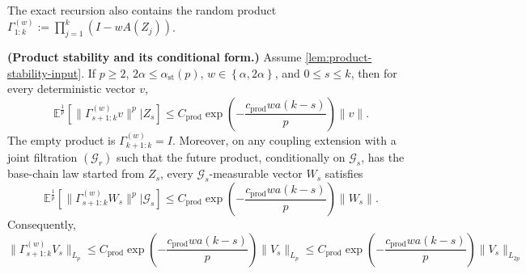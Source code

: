 The exact recursion also contains the random product
$\Gamma_{1:k}^{(w)} := \prod_{j = 1}^{k} (I - w A(Z_{j}))$.

\begin{lemma}\label{lem:burn-product-stability}
  \textbf{(Product stability and its conditional form.)}
  Assume \cref{lem:product-stability-input}. If $p \ge 2$,
  $2 \alpha \le \alpha_{\mathrm{st}}(p)$, $w \in \left\{ \alpha, 2 \alpha \right\}$, and $0 \le s \le k$,
  then for every deterministic vector $v$,
  \begin{equation}
\mathbb{E}^{\frac{1}{p}} \left[ \lVert \Gamma_{s + 1:k}^{(w)} v \rVert^{p} | Z_{s} \right]
    \le C_{\mathrm{prod}} \exp\left(- \frac{c_{\mathrm{prod}} w a (k - s)}{p}\right) \lVert v \rVert.
\label{eq:burn-product-stability-deterministic}
\end{equation}
  The empty product is $\Gamma_{k + 1:k}^{(w)} = I$. Moreover, on any coupling
  extension with a joint filtration $(\mathcal{G}_{r})$ such that the future product,
  conditionally on $\mathcal{G}_{s}$, has the base-chain law started from $Z_{s}$, every
  $\mathcal{G}_{s}$-measurable vector $W_{s}$ satisfies
  \begin{equation}
\mathbb{E}^{\frac{1}{p}} \left[ \lVert \Gamma_{s + 1:k}^{(w)} W_{s} \rVert^{p} | \mathcal{G}_{s} \right]
    \le C_{\mathrm{prod}} \exp\left(- \frac{c_{\mathrm{prod}} w a (k - s)}{p}\right) \lVert W_{s} \rVert.
\label{eq:burn-product-stability-conditional}
\end{equation}
  Consequently,
  \begin{equation}
\lVert \Gamma_{s + 1:k}^{(w)} V_{s} \rVert_{L_{p}}
    \le C_{\mathrm{prod}} \exp\left(- \frac{c_{\mathrm{prod}} w a (k - s)}{p}\right)
       \lVert V_{s} \rVert_{L_{p}}
    \le C_{\mathrm{prod}} \exp\left(- \frac{c_{\mathrm{prod}} w a (k - s)}{p}\right)
       \lVert V_{s} \rVert_{L_{2p}}
\label{eq:burn-product-stability-strong}
\end{equation}
\end{lemma}

